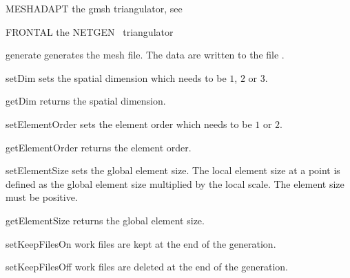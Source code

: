 \begin{memberdesc}[Design]{MESHADAPT}
the gmsh triangulator, see \gmshextern
\end{memberdesc}

\begin{memberdesc}[Design]{FRONTAL}
the NETGEN~\cite{NETGEN} triangulator
\end{memberdesc}

\begin{methoddesc}[Design]{generate}{}
generates the mesh file. The data are written to the file .
\end{methoddesc}

\begin{methoddesc}[Design]{setDim}{}
sets the spatial dimension which needs to be $1$, $2$ or $3$.
\end{methoddesc}

\begin{methoddesc}[Design]{getDim}{}
returns the spatial dimension.
\end{methoddesc}

\begin{methoddesc}[Design]{setElementOrder}{}
sets the element order which needs to be $1$ or $2$.
\end{methoddesc}

\begin{methoddesc}[Design]{getElementOrder}{}
returns the element order.
\end{methoddesc}

\begin{methoddesc}[Design]{setElementSize}{}
sets the global element size. The local element size at a point is defined as
the global element size multiplied by the local scale.
The element size must be positive.
\end{methoddesc}

\begin{methoddesc}[Design]{getElementSize}{}
returns the global element size.
\end{methoddesc}

\begin{methoddesc}[Design]{setKeepFilesOn}{}
work files are kept at the end of the generation.
\end{methoddesc}

\begin{methoddesc}[Design]{setKeepFilesOff}{}
work files are deleted at the end of the generation.
\end{methoddesc}

